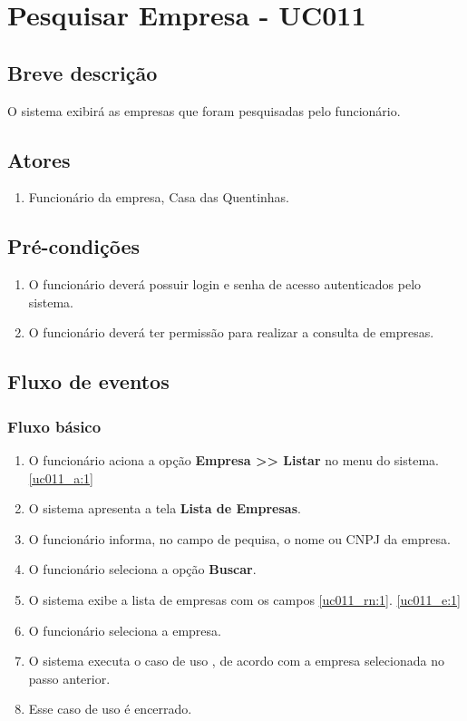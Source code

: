 \chapter{Pesquisar Empresa - UC011} \label{uc011}

\section{Breve descrição}

O sistema exibirá as empresas que foram pesquisadas pelo funcionário.

\section{Atores}

\begin{enumerate}
	\item Funcionário da empresa, Casa das Quentinhas.
\end{enumerate}

\section{Pré-condições}

\begin{enumerate}
	\item O funcionário deverá possuir login e senha de acesso autenticados pelo sistema.
	\item O funcionário deverá ter permissão para realizar a consulta de empresas.
\end{enumerate}

\section{Fluxo de eventos}

\subsection{Fluxo básico}

\begin{enumerate}[label=P\arabic*]
	\item O funcionário aciona a opção \textbf{Empresa >> Listar} no menu do sistema. \label{uc011_p:1}\ref{uc011_a:1}
	\item O sistema apresenta a tela \textbf{Lista de Empresas}.	
	\item O funcionário informa, no campo de pequisa, o nome ou CNPJ da empresa. \label{uc011_p:3}
	\item O funcionário seleciona a opção \textbf{Buscar}.
	\item O sistema exibe a lista de empresas com os campos \ref{uc011_rn:1}. \ref{uc011_e:1}
	\item O funcionário seleciona a empresa.
	\item O sistema executa o caso de uso , de acordo com a empresa selecionada no passo anterior.
	\item Esse caso de uso é encerrado.
\end{enumerate}

